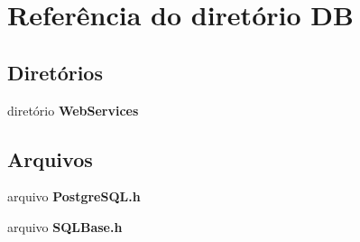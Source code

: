 \section{Referência do diretório DB}
\label{dir_650c24df5c8f5d23be8c0b1e4324fe90}
\subsection*{Diretórios}
\begin{DoxyCompactItemize}
\item 
diretório {\bf Web\+Services}
\end{DoxyCompactItemize}
\subsection*{Arquivos}
\begin{DoxyCompactItemize}
\item 
arquivo {\bf Postgre\+S\+Q\+L.\+h}
\item 
arquivo {\bf S\+Q\+L\+Base.\+h}
\end{DoxyCompactItemize}
